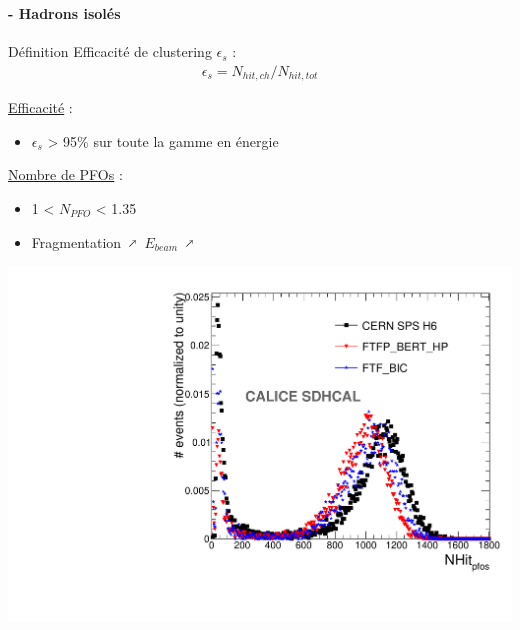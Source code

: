 \documentclass[8pt]{beamer}
\makeatletter
\newcommand{\fixed@sra}{$\vrule height 2\fontdimen22\textfont2 width 0pt\shortrightarrow$}
\newcommand{\shortarrow}[1]{%
  \mathrel{\text{\rotatebox[origin=c]{\numexpr#1*45}{\fixed@sra}}}
}
\makeatother
\begin{document}
  \begin{frame}
  \frametitle{\secname}
  \framesubtitle{\subsecname - Hadrons isolés}
    \begin{minipage}{0.48\linewidth}
      \begin{block}{Définition}
        Efficacité de clustering $\epsilon_s$ :
        \begin{align*}
          \epsilon_s = N_{hit,ch} / N_{hit,tot}
        \end{align*}
      \end{block}
      \underline{Efficacité} :
      \begin{itemize}
        \item $\epsilon_s$ > 95\% sur toute la gamme en énergie \\
      \end{itemize}
      \underline{Nombre de PFOs} :
      \begin{itemize}
        \item 1 < $N_{PFO}$ < 1.35
        \item Fragmentation $\shortarrow{1}$ $E_{beam}$ $\shortarrow{1}$
      \end{itemize}
      \begin{center}
        \includegraphics[width=0.8\linewidth]{Single_MC_DATA_COMP_PfoSize_70GeV.pdf}
      \end{center}
    \end{minipage} \hfill
    \begin{minipage}{0.48\linewidth}
      \begin{center}

\end{center}
\end{minipage}
\end{frame}
\end{document}
